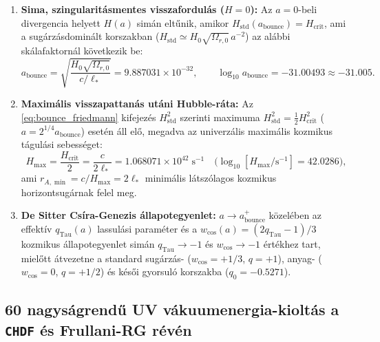 \documentclass[11pt,a4paper]{article}
\theoremstyle{remark}
\begin{document}
\begin{enumerate}
  \item \textbf{Sima, szingularit\'asmentes visszafordul\'as ($H = 0$):} Az $a = 0$-beli divergencia helyett $H(a)$ sim\'an elt\H{u}nik, amikor $H_{\mathrm{std}}(a_{\mathrm{bounce}}) = H_{\mathrm{crit}}$, ami a sug\'arz\'asdomin\'alt korszakban ($H_{\mathrm{std}} \simeq H_0\sqrt{\Omega_{r,0}}\,a^{-2}$) az al\'abbi sk\'alafaktorn\'al k\"ovetkezik be:
  \begin{equation}
    a_{\mathrm{bounce}} = \sqrt{\frac{H_0\sqrt{\Omega_{r,0}}}{c/\ell_*}} = 9.887031 \times 10^{-32}, \qquad \log_{10} a_{\mathrm{bounce}} = -31.00493 \approx -31.005.
    \label{eq:a_bounce}
  \end{equation}
  \item \textbf{Maxim\'alis visszapattan\'as ut\'ani Hubble-r\'ata:} Az \eqref{eq:bounce_friedmann} kifejez\'es $H_{\mathrm{std}}^2$ szerinti maximuma $H_{\mathrm{std}}^2 = \frac{1}{2}H_{\mathrm{crit}}^2$ ($a = 2^{1/4}a_{\mathrm{bounce}}$) eset\'en \'all el\H{o}, megadva az univerz\'alis maxim\'alis kozmikus t\'agul\'asi sebess\'eget:
  \begin{equation}
    H_{\max} = \frac{H_{\mathrm{crit}}}{2} = \frac{c}{2\ell_*} = 1.068071 \times 10^{42}\;\mathrm{s}^{-1} \quad \bigl(\log_{10}[H_{\max}/\mathrm{s}^{-1}] = 42.0286\bigr),
    \label{eq:h_max_bounce}
  \end{equation}
  ami $r_{A,\min} = c/H_{\max} = 2\ell_*$ minim\'alis l\'atsz\'olagos kozmikus horizontsug\'arnak felel meg.
  \item \textbf{De Sitter Cs\'ira-Genezis \'allapotegyenlet:} $a \to a_{\mathrm{bounce}}^+$ k\"ozel\'eben az effekt\'iv $q_{\mathrm{Tau}}(a)$ lassul\'asi param\'eter \'es a $w_{\mathrm{cos}}(a) = (2q_{\mathrm{Tau}} - 1)/3$ kozmikus \'allapotegyenlet sim\'an $q_{\mathrm{Tau}} \to -1$ \'es $w_{\mathrm{cos}} \to -1$ \'ert\'ekhez tart, miel\H{o}tt \'atvezetne a standard sug\'arz\'as- ($w_{\mathrm{cos}} = +1/3$, $q = +1$), anyag- ($w_{\mathrm{cos}} = 0$, $q = +1/2$) \'es k\'es\H{o}i gyorsul\'o korszakba ($q_0 = -0.5271$).
\end{enumerate}

\subsection{60 nagys\'agrend\H{u} UV v\'akuumenergia-kiolt\'as a \texttt{CHDF} \'es Frullani-RG r\'ev\'en}
\end{document}
